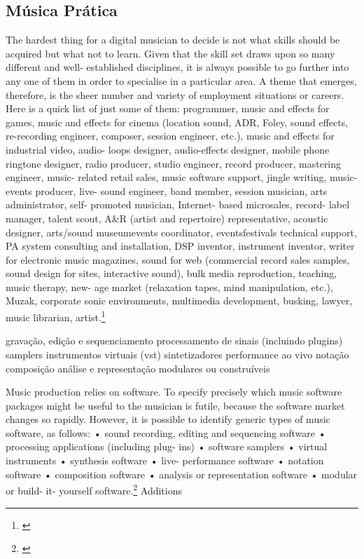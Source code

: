 \subsection{Música Prática}

\begin{citacao}


The hardest thing for a digital musician to decide is not what skills should be acquired but what not to learn. Given that the skill set draws upon so many different and well- established disciplines, it is always possible to go further into any one of them in order to specialise in a particular area. A theme that emerges, therefore, is the sheer number and variety of employment situations or careers. Here is a quick list of just some of them: programmer, music and effects for games, music and effects for cinema (location sound, ADR, Foley, sound effects, re-recording engineer, composer, session engineer, etc.), music and effects for industrial video, audio- loops designer, audio-effects designer, mobile phone ringtone designer, radio producer, studio engineer, record producer, mastering engineer, music- related retail sales, music software support, jingle writing, music- events producer, live- sound engineer, band member, session musician, arts administrator, self- promoted musician, Internet- based microsales, record- label manager, talent scout, A\&R (artist and repertoire) representative, acoustic designer, arts/sound museum\/events coordinator, events\/festivals technical support, PA system consulting and installation, DSP inventor, instrument inventor, writer for electronic music magazines, sound for web (commercial record sales samples, sound design for sites, interactive sound), bulk media reproduction, teaching, music therapy, new- age market (relaxation tapes, mind manipulation, etc.), Muzak, corporate sonic environments, multimedia development, busking, lawyer, music librarian, artist.\footnote{\cite[191]{Hugill2012}}
\end{citacao}


gravação, edição e sequenciamento
processamento de sinais (incluindo plugins)
samplers
instrumentos virtuais (vst)
sintetizadores
performance ao vivo
notação
composição
análise e representação
modulares ou construíveis

\begin{citacao}
Music production relies on software. To specify precisely which music software packages might be useful to the musician is futile, because the software market changes so rapidly. However, it is possible to identify generic types of music software, as follows:
• sound recording, editing and sequencing software • processing applications (including plug- ins) • software samplers • virtual instruments • synthesis software • live- performance software • notation software • composition software • analysis or representation software • modular or build- it- yourself software.\footnote{\cite[195]{Hugill2012}}
Additions
\end{citacao}


